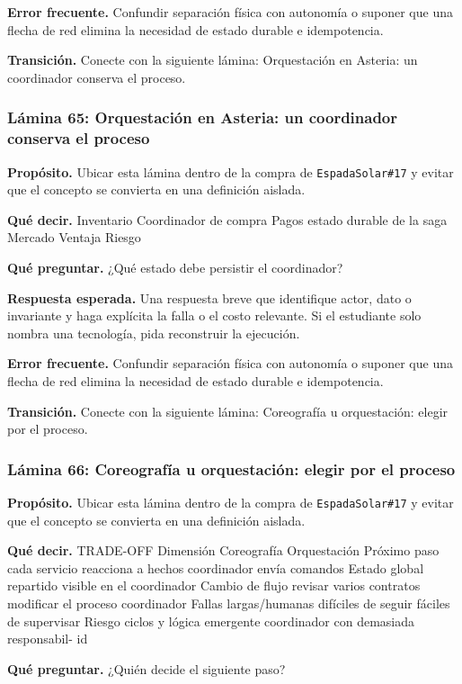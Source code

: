 \documentclass[variant=docente,cover=institutional,mode=screen]{ua-engineering-v6-article}
\begin{document}
\textbf{Error frecuente.} Confundir separación física con autonomía o suponer que una flecha de red elimina la necesidad de estado durable e idempotencia.

\textbf{Transición.} Conecte con la siguiente lámina: Orquestación en Asteria: un coordinador conserva el proceso.

\subsubsection*{Lámina 65: Orquestación en Asteria: un coordinador conserva el proceso}
\textbf{Propósito.} Ubicar esta lámina dentro de la compra de \texttt{EspadaSolar\#17} y evitar que el concepto se convierta en una definición aislada.

\textbf{Qué decir.} Inventario Coordinador de compra Pagos estado durable de la saga Mercado Ventaja Riesgo

\textbf{Qué preguntar.} ¿Qué estado debe persistir el coordinador?

\textbf{Respuesta esperada.} Una respuesta breve que identifique actor, dato o invariante y haga explícita la falla o el costo relevante. Si el estudiante solo nombra una tecnología, pida reconstruir la ejecución.

\textbf{Error frecuente.} Confundir separación física con autonomía o suponer que una flecha de red elimina la necesidad de estado durable e idempotencia.

\textbf{Transición.} Conecte con la siguiente lámina: Coreografía u orquestación: elegir por el proceso.

\subsubsection*{Lámina 66: Coreografía u orquestación: elegir por el proceso}
\textbf{Propósito.} Ubicar esta lámina dentro de la compra de \texttt{EspadaSolar\#17} y evitar que el concepto se convierta en una definición aislada.

\textbf{Qué decir.} TRADE-OFF Dimensión Coreografía Orquestación Próximo paso cada servicio reacciona a hechos coordinador envía comandos Estado global repartido visible en el coordinador Cambio de flujo revisar varios contratos modificar el proceso coordinador Fallas largas/humanas difíciles de seguir fáciles de supervisar Riesgo ciclos y lógica emergente coordinador con demasiada responsabil- id

\textbf{Qué preguntar.} ¿Quién decide el siguiente paso?
\end{document}
